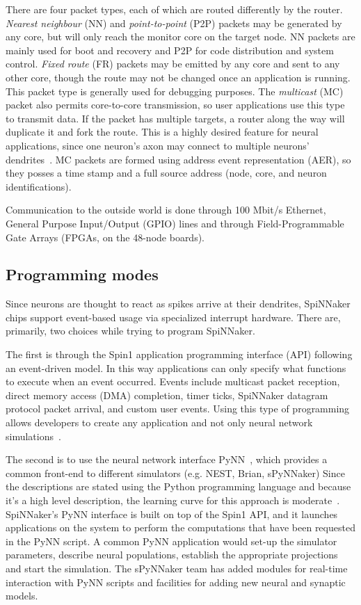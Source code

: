 There are four packet types, each of which are routed differently by the router. \emph{Nearest neighbour} (NN) and \emph{point-to-point} (P2P) packets may be generated by any core, but will only reach the monitor core on the target node. NN packets are mainly used for boot and recovery and P2P for code distribution and system control. \emph{Fixed route} (FR) packets may be emitted by any core and sent to any other core, though the route may not be changed once an application is running. This packet type is generally used for debugging purposes.
The \emph{multicast} (MC) packet also permits core-to-core transmission, so user applications use this type to transmit data. If the packet has multiple targets, a router along the way will duplicate it and fork the route. This is a highly desired feature for neural applications, since one neuron's axon may connect to multiple neurons' dendrites~\cite{spinn-net-patterson2012scalable}. MC packets are formed using address event representation (AER), so they posses a time stamp and a full source address (node, core, and neuron identifications).

Communication to the outside world is done through 100 Mbit/s Ethernet, General Purpose Input/Output (GPIO) lines and through Field-Programmable Gate Arrays (FPGAs, on the 48-node boards).

\subsection{Programming modes}
Since neurons are thought to react as spikes arrive at their dendrites, SpiNNaker chips support event-based usage via specialized interrupt hardware. There are, primarily, two choices while trying to program SpiNNaker. 

The first is through the Spin1 application programming interface (API) following an event-driven model. In this way applications can only specify what functions to execute when an event occurred. Events include multicast packet reception, direct memory access (DMA) completion, timer ticks, SpiNNaker datagram protocol packet arrival, and custom user events. Using this type of programming allows developers to create any application and not only neural network simulations~\cite{spinn-software-docs}. 

The second is to use the neural network interface PyNN~\cite{davison2008pynn}, which provides a common front-end to different simulators (e.g. NEST, Brian, sPyNNaker) Since the descriptions are stated using the Python programming language and because it's a high level description, the learning curve for this approach is moderate~\cite{spynnaker-github}. SpiNNaker's PyNN interface is built on top of the Spin1 API, and it launches applications on the system to perform the computations that have been requested in the PyNN script. A common PyNN application would set-up the simulator parameters, describe neural populations, establish the appropriate projections and start the simulation. The sPyNNaker team has added modules for real-time interaction with PyNN scripts and facilities for adding new neural and synaptic models.